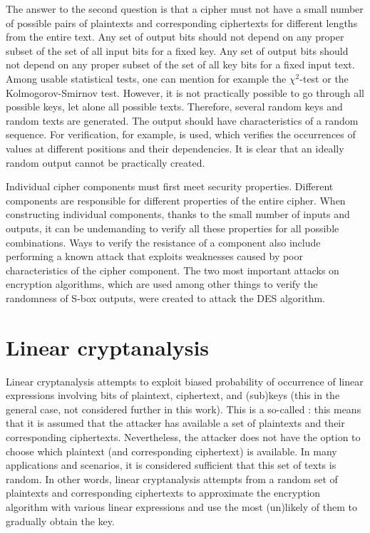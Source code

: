 The answer to the second question is that \cite{yokohama} a cipher must not have a small number of
possible pairs of plaintexts and corresponding ciphertexts for different lengths from the entire text.
Any set of output bits should not depend on any proper subset
of the set of all input bits for a fixed key.
Any set of output bits should not depend on any proper subset
of the set of all key bits for a fixed input text. Among usable statistical tests,
one can mention for example the $\chi^2$-test or the Kolmogorov-Smirnov test. However, it is not practically
possible to go through all possible keys, let alone all possible texts. Therefore, several
random keys and random texts are generated. The output should have characteristics
of a random sequence. For verification, for example,  is used,
which verifies the occurrences of values at different positions and their dependencies.
It is clear that an ideally random output cannot be practically created.

Individual cipher components must first meet security properties. Different components are
responsible for different properties of the entire cipher.
When constructing individual components, thanks to the small number of inputs and outputs,
it can be undemanding to verify all these properties for all possible combinations.
Ways to verify the resistance of a component also include performing a known attack that
exploits weaknesses caused by poor characteristics of the cipher component.
The two most important attacks on encryption algorithms, which are used among other things to verify
the randomness of S-box outputs, were created to attack the DES algorithm.

\section{Linear cryptanalysis}
Linear cryptanalysis \cite{tutorialLADA} attempts to exploit biased probability of occurrence of linear expressions
involving bits of plaintext, ciphertext, and (sub)keys (this in the general case,
not considered further in this work).
This is a so-called : this means that it is assumed that
the attacker has available a set of plaintexts and their corresponding ciphertexts.
Nevertheless, the attacker does not have the option to choose which plaintext (and
corresponding ciphertext) is available. In many applications and scenarios, it is considered sufficient that
this set of texts is random.
In other words, linear cryptanalysis attempts from a random set of plaintexts and corresponding ciphertexts to
approximate the encryption algorithm with various
linear expressions and use the most (un)likely of them to gradually obtain the key.


